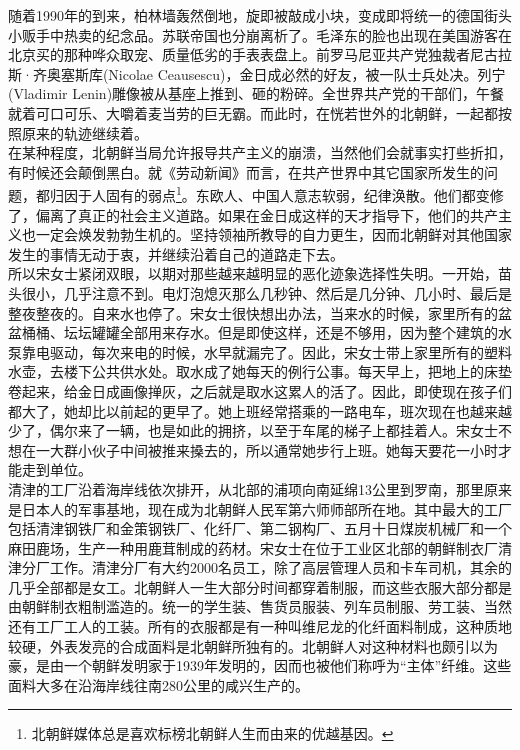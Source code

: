 \ifnum{}
	\begin{multicols}{\theparacolNo}
\fi
随着1990年的到来，柏林墙轰然倒地，旋即被敲成小块，变成即将统一的德国街头小贩手中热卖的纪念品。苏联帝国也分崩离析了。毛泽东的脸也出现在美国游客在北京买的那种哗众取宠、质量低劣的手表表盘上。前罗马尼亚共产党独裁者尼古拉斯·齐奥塞斯库(Nicolae Ceausescu)，金日成必然的好友，被一队士兵处决。列宁(Vladimir Lenin)雕像被从基座上推到、砸的粉碎。全世界共产党的干部们，午餐就着可口可乐、大嚼着麦当劳的巨无霸。而此时，在恍若世外的北朝鲜，一起都按照原来的轨迹继续着。\\

在某种程度，北朝鲜当局允许报导共产主义的崩溃，当然他们会就事实打些折扣，有时候还会颠倒黑白。就《劳动新闻》而言，在共产世界中其它国家所发生的问题，都归因于人固有的弱点\footnote{北朝鲜媒体总是喜欢标榜北朝鲜人生而由来的优越基因。}。东欧人、中国人意志软弱，纪律涣散。他们都变修了，偏离了真正的社会主义道路。如果在金日成这样的天才指导下，他们的共产主义也一定会焕发勃勃生机的。坚持领袖所教导的自力更生，因而北朝鲜对其他国家发生的事情无动于衷，并继续沿着自己的道路走下去。\\

所以宋女士紧闭双眼，以期对那些越来越明显的恶化迹象选择性失明。一开始，苗头很小，几乎注意不到。电灯泡熄灭那么几秒钟、然后是几分钟、几小时、最后是整夜整夜的。自来水也停了。宋女士很快想出办法，当来水的时候，家里所有的盆盆桶桶、坛坛罐罐全部用来存水。但是即使这样，还是不够用，因为整个建筑的水泵靠电驱动，每次来电的时候，水早就漏完了。因此，宋女士带上家里所有的塑料水壶，去楼下公共供水处。取水成了她每天的例行公事。每天早上，把地上的床垫卷起来，给金日成画像掸灰，之后就是取水这累人的活了。因此，即使现在孩子们都大了，她却比以前起的更早了。她上班经常搭乘的一路电车，班次现在也越来越少了，偶尔来了一辆，也是如此的拥挤，以至于车尾的梯子上都挂着人。宋女士不想在一大群小伙子中间被推来搡去的，所以通常她步行上班。她每天要花一小时才能走到单位。\\

清津的工厂沿着海岸线依次排开，从北部的浦项向南延绵13公里到罗南，那里原来是日本人的军事基地，现在成为北朝鲜人民军第六师师部所在地。其中最大的工厂包括清津钢铁厂和金策钢铁厂、化纤厂、第二钢构厂、五月十日煤炭机械厂和一个麻田鹿场，生产一种用鹿茸制成的药材。宋女士在位于工业区北部的朝鲜制衣厂清津分厂工作。清津分厂有大约2000名员工，除了高层管理人员和卡车司机，其余的几乎全部都是女工。北朝鲜人一生大部分时间都穿着制服，而这些衣服大部分都是由朝鲜制衣粗制滥造的。统一的学生装、售货员服装、列车员制服、劳工装、当然还有工厂工人的工装。所有的衣服都是有一种叫维尼龙的化纤面料制成，这种质地较硬，外表发亮的合成面料是北朝鲜所独有的。北朝鲜人对这种材料也颇引以为豪，是由一个朝鲜发明家于1939年发明的，因而也被他们称呼为“主体”纤维。这些面料大多在沿海岸线往南280公里的咸兴生产的。\\


\end{multicols}
